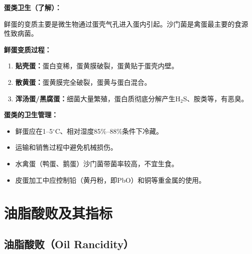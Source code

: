 \begin{tipbox}
\textbf{蛋类卫生（了解）：}

鲜蛋的变质主要是微生物通过蛋壳气孔进入蛋内引起。沙门菌是禽蛋最主要的食源性致病菌。

\textbf{鲜蛋变质过程：}
\begin{enumerate}[leftmargin=*]
    \item \textbf{贴壳蛋：}蛋白变稀，蛋黄膜破裂，蛋黄贴于蛋壳内壁。
    \item \textbf{散黄蛋：}蛋黄膜完全破裂，蛋黄与蛋白混合。
    \item \textbf{浑汤蛋/黑腐蛋：}细菌大量繁殖，蛋白质彻底分解产生H$_2$S、胺类等，有恶臭。
\end{enumerate}

\textbf{蛋类的卫生管理：}
\begin{itemize}[leftmargin=*]
    \item 鲜蛋应在1--5$^\circ$C、相对湿度85\%--88\%条件下冷藏。
    \item 运输和销售过程中避免机械损伤。
    \item 水禽蛋（鸭蛋、鹅蛋）沙门菌带菌率较高，不宜生食。
    \item 皮蛋加工中应控制铅（黄丹粉，即PbO）和铜等重金属的使用。
\end{itemize}
\end{tipbox}


\section{油脂酸败及其指标}

\subsection{油脂酸败（Oil Rancidity）}

